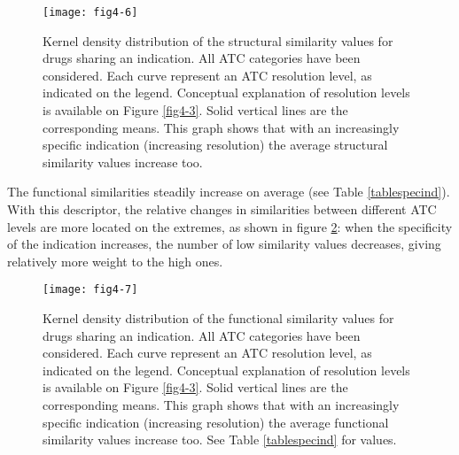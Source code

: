 \begin{figure}[H]
    \centering
    \texttt{[image: fig4-6]}
    \caption{Kernel density distribution of the structural similarity values for drugs sharing an indication. All ATC categories have been considered. Each curve represent an ATC resolution level, as indicated on the legend. Conceptual explanation of resolution levels is available on Figure \ref{fig4-3}. Solid vertical lines are the corresponding means. This graph shows that with an increasingly specific indication (increasing resolution) the average structural similarity values increase too.}
    \label{fig4-6}
\end{figure}

The functional similarities steadily increase on average (see Table \ref{tablespecind}). With this descriptor, the relative changes in similarities between different ATC levels are more located on the extremes, as shown in figure \ref{fig4-7}: when the specificity of the indication increases, the number of low similarity values decreases, giving relatively more weight to the high ones.

\begin{figure}[H]
    \centering
    \texttt{[image: fig4-7]}
    \caption{Kernel density distribution of the functional similarity values for drugs sharing an indication. All ATC categories have been considered. Each curve represent an ATC resolution level, as indicated on the legend. Conceptual explanation of resolution levels is available on Figure \ref{fig4-3}. Solid vertical lines are the corresponding means. This graph shows that with an increasingly specific indication (increasing resolution) the average functional similarity values increase too. See Table \ref{tablespecind} for values.}
    \label{fig4-7}
\end{figure}

